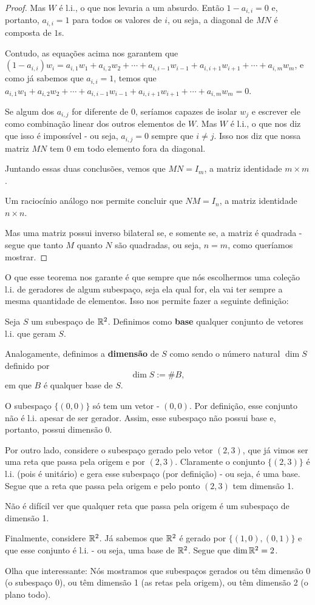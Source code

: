\begin{proof}
Mas $W$ é l.i., o que nos levaria a um absurdo. Então $1-a_{i,i}=0$ e, portanto, $a_{i,i}=1$ para todos os valores de $i$, ou seja, a diagonal de $MN$ é composta de $1$s.

Contudo, as equações acima nos garantem que $(1-a_{i,i})w_i=a_{i,1}w_1+a_{i,2}w_2+\cdots+a_{i,i-1}w_{i-1}+a_{i,i+1}w_{i+1}+\cdots+a_{i,m}w_m$, e como já sabemos que $a_{i,i}=1$, temos que $a_{i,1}w_1+a_{i,2}w_2+\cdots+a_{i,i-1}w_{i-1}+a_{i,i+1}w_{i+1}+\cdots+a_{i,m}w_m=0$. 

Se algum dos $a_{i,j}$ for diferente de 0, seríamos capazes de isolar $w_j$ e escrever ele como combinação linear dos outros elementos de $W$. Mas $W$ é l.i., o que nos diz que isso é impossível - ou seja, $a_{i,j}=0$ sempre que $i\neq j$. Isso nos diz que nossa matriz $MN$ tem 0 em todo elemento fora da diagonal.

Juntando essas duas conclusões, vemos que $MN=I_m$, a matriz identidade $m\times m$.

Um raciocínio análogo nos permite concluir que $NM=I_n$, a matriz identidade $n\times n$.

Mas uma matriz possui inverso bilateral se, e somente se, a matriz é quadrada - segue que tanto $M$ quanto $N$ são quadradas, ou seja, $n=m$, como queríamos mostrar. 
\end{proof}

O que esse teorema nos garante é que sempre que nós escolhermos uma coleção l.i. de geradores de algum subespaço, seja ela qual for, ela vai ter sempre a mesma quantidade de elementos. Isso nos permite fazer a seguinte definição:

\begin{df}
	Seja $S$ um subespaço de $\mathbb R^2$. Definimos como \textbf{base} qualquer conjunto de vetores l.i. que geram $S$.
	
	Analogamente, definimos a \textbf{dimensão} de $S$ como sendo o número natural $\dim S$ definido por $$\dim S:=\#B,$$ em que $B$ é qualquer base de $S$.
\end{df}
\begin{ex}
	O subespaço $\{(0,0)\}$ só tem um vetor - $(0,0)$. Por definição, esse conjunto não é l.i. apesar de ser gerador. Assim, esse subespaço não possui base e, portanto, possui dimensão 0.
	
	\bigskip
	Por outro lado, considere o subespaço gerado pelo vetor $(2,3)$, que já vimos ser uma reta que passa pela origem e por $(2,3)$. Claramente o conjunto $\{(2,3)\}$ é l.i. (pois é unitário) e gera esse subespaço (por definição) - ou seja, é uma base. Segue que a reta que passa pela origem e pelo ponto $(2,3)$ tem dimensão 1.
	
	Não é difícil ver que qualquer reta que passa pela origem é um subespaço de dimensão 1.
	
	\bigskip
	Finalmente, considere $\mathbb R^2$. Já sabemos que $\mathbb R^2$ é gerado por $\{(1,0),(0,1)\}$ e que esse conjunto é l.i. - ou seja, uma base de $\mathbb R^2$. Segue que $\dim\mathbb R^2=2$.
	
	\bigskip
	Olha que interessante: Nós mostramos que subespaços gerados ou têm dimensão 0 (o subespaço 0), ou têm dimensão 1 (as retas pela origem), ou têm dimensão 2 (o plano todo).
\end{ex}

